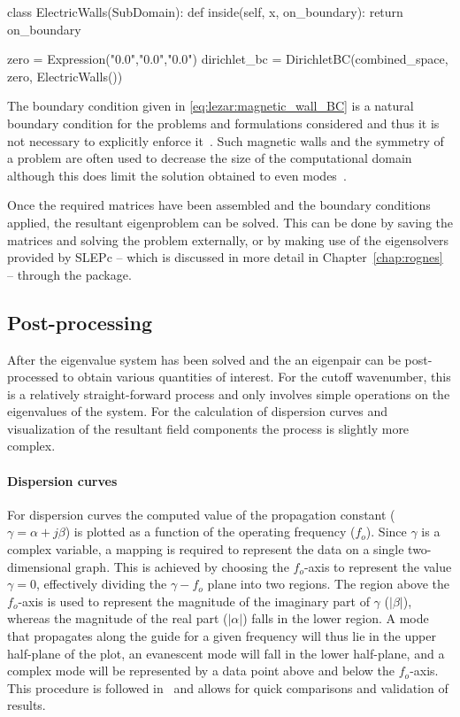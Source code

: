 \begin{python}
class ElectricWalls(SubDomain):
    def inside(self, x, on_boundary):
        return on_boundary

zero = Expression("0.0","0.0","0.0")
dirichlet_bc = DirichletBC(combined_space, zero, ElectricWalls())
\end{python}

The boundary condition given in \eqref{eq:lezar:magnetic_wall_BC} is a natural boundary condition for the problems and formulations considered and thus it is not necessary to explicitly enforce it~\citep{PelosiCoccioliSelleri1998}. Such magnetic walls and the symmetry of a problem are often used to decrease the size of the computational domain although this does limit the solution obtained to even modes~\citep{Jin2002}.

Once the required matrices have been assembled and the boundary conditions applied, the resultant eigenproblem can be solved. This can be done by saving the matrices and solving the problem externally, or by making use of the eigensolvers provided by SLEPc -- which is discussed in more detail in Chapter~\ref{chap:rognes} -- through the \fenics{} package.

\subsection{Post-processing}
After the eigenvalue system has been solved and the an eigenpair can be post-processed to obtain various quantities of interest. For the cutoff wavenumber, this is a relatively straight-forward process and only involves simple operations on the eigenvalues of the system. For the calculation of dispersion curves and visualization of the resultant field components the process is slightly more complex.

\paragraph{Dispersion curves}
For dispersion curves the computed value of the propagation constant ($\gamma = \alpha + j\beta$) is plotted as a function of the operating frequency ($f_o$). Since $\gamma$ is a complex variable, a mapping is required to represent the data on a single two-dimensional graph. This is achieved by choosing the $f_o$-axis to represent the value $\gamma = 0$, effectively dividing the {$\gamma-f_o$} plane into two regions. The region above the $f_o$-axis is used to represent the magnitude of the imaginary part of $\gamma$ ($|\beta|$), whereas the magnitude of the real part ($|\alpha|$) falls in the lower region. A mode that propagates along the guide for a given frequency will thus lie in the upper half-plane of the plot, an evanescent mode will fall in the lower half-plane, and a complex mode will be represented by a data point above and below the $f_o$-axis.  This procedure is followed in~\citet{PelosiCoccioliSelleri1998} and allows for quick comparisons and validation of results.


